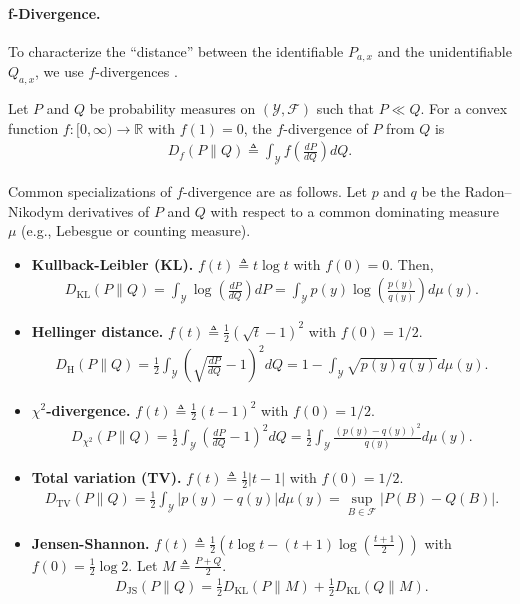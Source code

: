 \paragraph{f-Divergence.}
To characterize the ``distance'' between the identifiable $P_{a,x}$ and the unidentifiable $Q_{a,x}$, we use $f$-divergences \citep{ali1966general,csiszar1967fdivergenceDPI}.
\begin{definition}\label{def:f-div}
    \normalfont
    Let $P$ and $Q$ be probability measures on $(\mathcal{Y}, \mathcal{F})$ such that $P \ll Q$. For a convex function $f:[0, \infty) \rightarrow \mathbb{R}$ with $f(1)=0$, the $f$-divergence of $P$ from $Q$ is 
    \begin{align}
        D_f(P \| Q) \triangleq \int_{\mathcal{Y}} f\left(\frac{dP}{dQ}\right) dQ.
    \end{align}
\end{definition}
Common specializations of $f$-divergence are as follows. Let $p$ and $q$ be the Radon–Nikodym derivatives of $P$ and $Q$ with respect to a common dominating measure $\mu$ (e.g., Lebesgue or counting measure).
\begin{itemize}[leftmargin=*,itemsep=0pt]
    \item \textbf{Kullback-Leibler (KL).} $f(t) \triangleq t \log t$ with $f(0) = 0$. Then, 
    \begin{align}
        D_{\mathrm{KL}}(P \| Q) = \int_{\mathcal{Y}} \log \left(\frac{dP}{dQ}\right) dP = \int_{\mathcal{Y}} p(y) \log \left( \frac{p(y)}{q(y)} \right) d\mu(y).
    \end{align}
    \item \textbf{Hellinger distance.} $f(t) \triangleq \frac{1}{2}(\sqrt{t}-1)^2$ with $f(0) = 1/2$. 
    \begin{align}
        D_{\mathrm{H}}(P \| Q) = \frac{1}{2}\int_{\mathcal{Y}} \left(\sqrt{\frac{dP}{dQ}} - 1 \right)^2 dQ = 1-\int_{\mathcal{Y}}\sqrt{p(y)q(y)} d\mu(y).
    \end{align}
    \item \textbf{$\chi^2$-divergence.} $f(t) \triangleq \frac{1}{2}(t-1)^2$ with $f(0) = 1/2$. 
    \begin{align}
        D_{\chi^2}(P \| Q) = \frac{1}{2}\int_{\mathcal{Y}} \left(\frac{dP}{dQ} - 1 \right)^2 dQ = \frac{1}{2}\int_{\mathcal{Y}} \frac{(p(y) - q(y))^2}{q(y)} d\mu(y).
    \end{align}
    \item \textbf{Total variation (TV).} $f(t) \triangleq \frac{1}{2}|t-1|$ with $f(0) = 1/2$. 
    \begin{align}
        D_{\mathrm{TV}}(P \| Q) = \frac{1}{2}\int_{\mathcal{Y}} |p(y) - q(y)| d\mu(y) = \sup_{B \in \mathcal{F}} |P(B) - Q(B)|.
    \end{align}
    \item \textbf{Jensen-Shannon.} $f(t) \triangleq \frac12 (t\log t - (t+1)\log(\frac{t+1}{2}))$ with $f(0) = \frac{1}{2}\log 2$. Let $M \triangleq \frac{P+Q}{2}$. 
    \begin{align}
        D_{\mathrm{JS}}(P \| Q) = \frac{1}{2}D_{\mathrm{KL}}(P \| M) + \frac{1}{2}D_{\mathrm{KL}}(Q \| M).
    \end{align}
\end{itemize}


